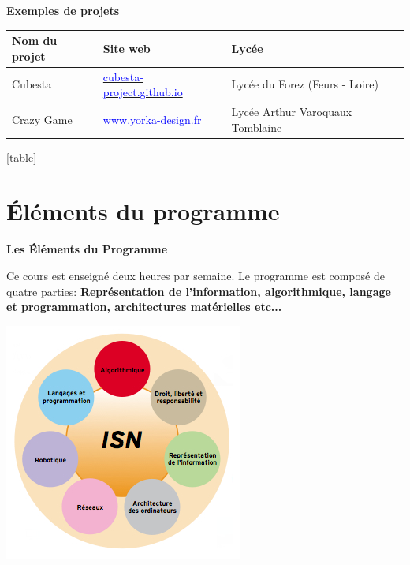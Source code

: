 \documentclass[a4paper, 12pt]{beamer}
\begin{document}
	
	\begin{frame}
	
		
		\begin{block}{\textbf{Exemples de projets}}
	\begin{table}
    \begin{tabular}{|l|l|p{3cm}|} \hline
    
\textbf{Nom du projet} & \textbf{Site web}&\textbf{Lycée}\\ \hline  \pause
    
Cubesta&\href{http://cubesta-project.github.io/CubeSTA/}{\textcolor{blue}{cubesta-project.github.io}}&Lycée du Forez (Feurs - Loire)\\ \hline \pause
    
Crazy Game&\href{http://www.yorka-design.fr/ISN/}{\textcolor{blue}{www.yorka-design.fr}}&Lycée Arthur Varoquaux Tomblaine \\ \hline
    \end{tabular}
    \end{table}
		\end{block}
	\end{frame}
[table]
		
			\section{Éléments du programme}
	\begin{frame}
		
		\begin{block}{\textbf{Les Éléments du Programme}}
		
 Ce cours est enseigné deux heures par semaine. Le programme est composé de quatre parties: \textbf{ Représentation de l’information, algorithmique, langage et programmation, architectures matérielles etc...}
\vfill
\begin{center}
 \includegraphics[scale=0.5]{isn.png} 
\end{center}
\vfill
		\end{block}	
\end{frame}
	
\end{document}
